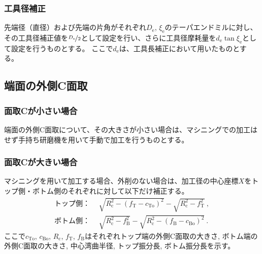 \subsubsection{工具径補正}
先端径（直径）および先端の片角がそれぞれ$D_\mathrm e$, $\xi_\mathrm e$のテーパエンドミルに対し、その工具径補正値を$\nicefrac{D_\mathrm e}2$として設定を行い、さらに工具径摩耗量を$d_\mathrm e\tan\xi_\mathrm e$として設定を行うものとする。
ここで$d_\mathrm e$は、工具長補正において用いたものとする。


\subsection{端面の外側C面取}

\subsubsection{面取Cが小さい場合}
端面の外側C面取について、その大きさが小さい場合は、マシニングでの加工はせず手持ち研磨機を用いて手動で加工を行うものとする。

\subsubsection{面取Cが大きい場合}
マシニングを用いて加工する場合、外削のない場合は、加工径の中心座標$X$をトップ側・ボトム側のそれぞれに対して以下だけ補正する。
\begin{align*}
  \text{トップ側：}&~~
  \sqrt{R_\mathrm c^2-\left(f_\mathrm T-c_\mathrm{To}\right)^2}-\sqrt{R_\mathrm c^2-f_\mathrm T^2}\ ,\\
  \text{ボトム側：}&~~
  \sqrt{R_\mathrm c^2-f_\mathrm B^2}-\sqrt{R_\mathrm c^2-\left(f_\mathrm B-c_\mathrm{Bo}\right)^2}\ .
\end{align*}
ここで$c_\mathrm{To}$, $c_\mathrm{Bo}$, $R_\mathrm c$, $f_\mathrm T$, $f_\mathrm B$はそれぞれトップ端の外側C面取の大きさ, ボトム端の外側C面取の大きさ, 中心湾曲半径, トップ振分長, ボトム振分長を示す。


